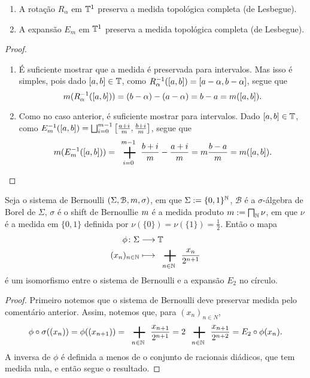 \begin{proposition}
	\begin{enumerate}
	\item A rotação $R_\alpha$ em $\mathbb{T}^1$ preserva a medida topológica completa (de Lesbegue).
	\item A expansão $E_m$ em $\mathbb{T}^1$ preserva a medida topológica completa (de Lesbegue).
	\end{enumerate}
\end{proposition}
\begin{proof}
	\begin{enumerate}
	\item É suficiente mostrar que a medida é preservada para intervalos. Mas isso é simples, pois dado $\left[{a},{b}\right] \in \mathbb{T}$, como $R_{\alpha}^{-1}(\left[{a},{b}\right])=\left[{a-\alpha},{b-\alpha}\right]$, segue que
	\begin{equation*}
	m(R_{\alpha}^{-1}(\left[{a},{b}\right]))=(b-\alpha)-(a-\alpha)=b-a=m(\left[{a},{b}\right]).
	 \end{equation*}

	 \item Como no caso anterior, é suficiente mostrar para intervalos. Dado $\left[{a},{b}\right] \in \mathbb{T}$, como $E_m^{-1}(\left[{a},{b}\right])=\bigsqcup_{i=0}^{m-1} \left[{\frac{a+i}{m}},{\frac{b+i}{m}}\right]$, segue que
	\begin{equation*}
	\med(E_m\inv(\intff{a}{b}))=\sum_{i=0}^{m-1}\frac{b+i}{m}-\frac{a+i}{m}=m\frac{b-a}{m}=\med(\intff{a}{b}).
	 \end{equation*}
	\end{enumerate}
\end{proof}

\begin{proposition}
	Seja o sistema de Bernoulli $(\Sigma,\mathcal{B},m,\sigma)$, em que $\Sigma := \{0,1\}^{\mathbb{N}}$, $\mathcal{B}$ é a $\sigma$-álgebra de Borel de $\Sigma$, $\sigma$ é o shift de Bernoullie $m$ é a medida produto $\med := \prod_{\N} \nu$, em que $\nu$ é a medida em $\{0,1\}$ definida por $\nu(\{0\})=\nu(\{1\})=\frac{1}{2}$. Então o mapa
	\begin{align*}
	\func{\phi}{\Sigma}{\T}{(x_n)_{n \in \N}}{\sum_{n \in \N} \frac{x_n}{2^{n+1}}}
	\end{align*}
é um isomorfismo entre o sistema de Bernoulli e a expansão $E_2$ no círculo.
\end{proposition}
\begin{proof}
	Primeiro notemos que o sistema de Bernoulli deve preservar medida pelo comentário anterior. Assim, notemos que, para $(x_n)_{n \in N}$,
	\begin{equation*}
	\phi \circ \sigma((x_n))=\phi((x_{n+1}))=\sum_{n \in \N} \frac{x_{n+1}}{2^{n+1}}=2\sum_{n \in \N} \frac{x_{n+1}}{2^{n+2}}= E_2\circ \phi(x_n).
	\end{equation*}
A inversa de $\phi$ é definida a menos de o conjunto de racionais diádicos, que tem medida nula, e então segue o resultado.
\end{proof}


